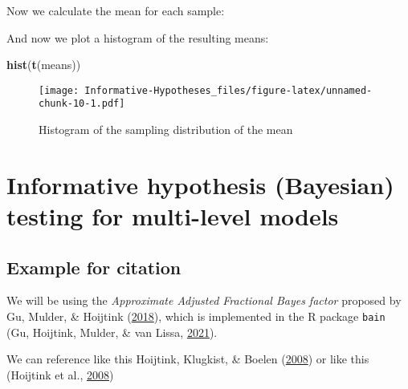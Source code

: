 \documentclass[
]{book}
\newenvironment{Shaded}{\begin{snugshade}}{\end{snugshade}}
\newcommand{\DecValTok}[1]{\textcolor[rgb]{0.00,0.00,0.81}{#1}}
\newcommand{\KeywordTok}[1]{\textcolor[rgb]{0.13,0.29,0.53}{\textbf{#1}}}
\newcommand{\NormalTok}[1]{#1}
\newcommand{\OperatorTok}[1]{\textcolor[rgb]{0.81,0.36,0.00}{\textbf{#1}}}
\newcommand{\StringTok}[1]{\textcolor[rgb]{0.31,0.60,0.02}{#1}}
\begin{document}
Now we calculate the mean for each sample:

\begin{Shaded}
\end{Shaded}

And now we plot a histogram of the resulting means:

\begin{Shaded}
\begin{Highlighting}[]
\KeywordTok{hist}\NormalTok{(}\KeywordTok{t}\NormalTok{(means))}
\end{Highlighting}
\end{Shaded}

\begin{figure}
\centering
\texttt{[image: Informative-Hypotheses\_files/figure-latex/unnamed-chunk-10-1.pdf]}
\caption{\label{fig:unnamed-chunk-10}Histogram of the sampling distribution of the mean}
\end{figure}

\hypertarget{informative-hypothesis-bayesian-testing-for-multi-level-models}{%
\chapter{Informative hypothesis (Bayesian) testing for multi-level models}\label{informative-hypothesis-bayesian-testing-for-multi-level-models}}

\hypertarget{example-for-citation}{%
\section{Example for citation}\label{example-for-citation}}

We will be using the \emph{Approximate Adjusted Fractional Bayes factor} proposed by Gu, Mulder, \& Hoijtink (\protect\hyperlink{ref-gu2018approximated}{2018}), which is implemented in the R package \texttt{bain} (Gu, Hoijtink, Mulder, \& van Lissa, \protect\hyperlink{ref-bain}{2021}).

We can reference like this Hoijtink, Klugkist, \& Boelen (\protect\hyperlink{ref-hoijtink2008bayesian}{2008}) or like this (Hoijtink et al., \protect\hyperlink{ref-hoijtink2008bayesian}{2008})
\end{document}
